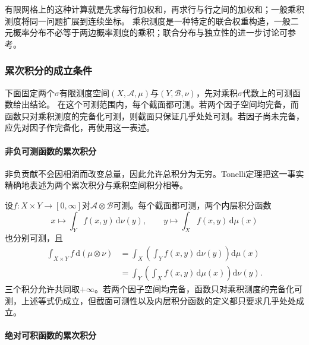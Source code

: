 有限网格上的这种计算就是先求每行加权和，再求行与行之间的加权和；一般乘积测度将同一问题扩展到连续坐标。
乘积测度是一种特定的联合权重构造，一般二元概率分布不必等于两边概率测度的乘积；联合分布与独立性的进一步讨论可参考。

\subsubsection{累次积分的成立条件}

下面固定两个$\sigma$有限测度空间$(X,\mathcal A,\mu)$与$(Y,\mathcal B,\nu)$，先对乘积$\sigma$代数上的可测函数给出结论。
在这个可测范围内，每个截面都可测。若两个因子空间均完备，而函数只对乘积测度的完备化可测，则截面只保证几乎处处可测。若因子尚未完备，应先对因子作完备化，再使用这一表述。

\paragraph{非负可测函数的累次积分}

非负贡献不会因相消而改变总量，因此允许总积分为无穷。Tonelli定理把这一事实精确地表述为两个累次积分与乘积空间积分相等。
\begin{theorem}[Tonelli定理]
\label{thm:analysis-tonelli-fubini}
设$f:X\times Y\to[0,\infty]$对$\mathcal A\otimes\mathcal B$可测。每个截面都可测，两个内层积分函数
\[
 x\longmapsto\int_Yf(x,y)\,\mathrm d\nu(y),\qquad
 y\longmapsto\int_Xf(x,y)\,\mathrm d\mu(x)
\]
也分别可测，且
\[
 \begin{aligned}
 \int_{X\times Y}f\,\mathrm d(\mu\otimes\nu)
 &=\int_X\left(\int_Yf(x,y)\,\mathrm d\nu(y)\right)\mathrm d\mu(x)\\
 &=\int_Y\left(\int_Xf(x,y)\,\mathrm d\mu(x)\right)\mathrm d\nu(y).
 \end{aligned}
\]
三个积分允许共同取$+\infty$。若两个因子空间均完备，函数只对乘积测度的完备化可测，上述等式仍成立，但截面可测性以及内层积分函数的定义都只要求几乎处处成立。
\end{theorem}

\paragraph{绝对可积函数的累次积分}

